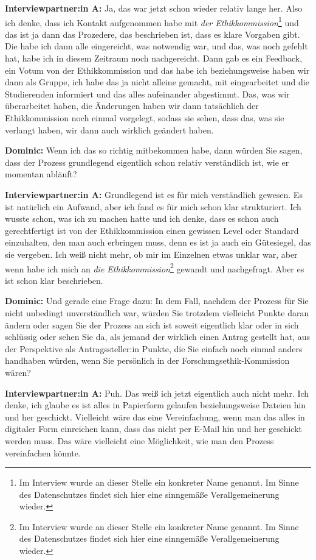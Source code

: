 \documentclass[a4paper,12pt,twoside]{scrreprt}
\begin{document}
\textbf{Interviewpartner:in A:} Ja, das war jetzt schon wieder relativ lange her. Also ich denke, dass ich Kontakt aufgenommen habe mit \textit{der Ethikkommission}\footnote{Im Interview wurde an dieser Stelle ein konkreter Name genannt. Im Sinne des Datenschutzes findet sich hier eine sinngemäße Verallgemeinerung wieder.} und das ist ja dann das Prozedere, das beschrieben ist, dass es klare Vorgaben gibt. Die habe ich dann alle eingereicht, was notwendig war, und das, was noch gefehlt hat, habe ich in diesem Zeitraum noch nachgereicht. Dann gab es ein Feedback, ein Votum von der Ethikkommission und das habe ich beziehungsweise haben wir dann als Gruppe, ich habe das ja nicht alleine gemacht, mit eingearbeitet und die Studierenden informiert und das alles aufeinander abgestimmt. Das, was wir überarbeitet haben, die Änderungen haben wir dann tatsächlich der Ethikkommission noch einmal vorgelegt, sodass sie sehen, dass das, was sie verlangt haben, wir dann auch wirklich geändert haben.

\textbf{Dominic:} Wenn ich das so richtig mitbekommen habe, dann würden Sie sagen, dass der Prozess grundlegend eigentlich schon relativ verständlich ist, wie er momentan abläuft?

\textbf{Interviewpartner:in A:} Grundlegend ist es für mich verständlich gewesen. Es ist natürlich ein Aufwand, aber ich fand es für mich schon klar strukturiert. Ich wusste schon, was ich zu machen hatte und ich denke, dass es schon auch gerechtfertigt ist von der Ethikkommission einen gewissen Level oder Standard einzuhalten, den man auch erbringen muss, denn es ist ja auch ein Gütesiegel, das sie vergeben. Ich weiß nicht mehr, ob mir im Einzelnen etwas unklar war, aber wenn habe ich mich an \textit{die Ethikkommission}\footnote{Im Interview wurde an dieser Stelle ein konkreter Name genannt. Im Sinne des Datenschutzes findet sich hier eine sinngemäße Verallgemeinerung wieder.} gewandt und nachgefragt. Aber es ist schon klar beschrieben.

\textbf{Dominic:} Und gerade eine Frage dazu: In dem Fall, nachdem der Prozess für Sie nicht unbedingt unverständlich war, würden Sie trotzdem vielleicht Punkte daran ändern oder sagen Sie der Prozess an sich ist soweit eigentlich klar oder in sich schlüssig oder sehen Sie da, als jemand der wirklich einen Antrag gestellt hat, aus der Perspektive als Antragssteller:in Punkte, die Sie einfach noch einmal anders handhaben würden, wenn Sie persönlich in der Forschungsethik-Kommission wären?

\textbf{Interviewpartner:in A:} Puh. Das weiß ich jetzt eigentlich auch nicht mehr. Ich denke, ich glaube es ist alles in Papierform gelaufen beziehungsweise Dateien hin und her geschickt. Vielleicht wäre das eine Vereinfachung, wenn man das alles in digitaler Form einreichen kann, dass das nicht per E-Mail hin und her geschickt werden muss. Das wäre vielleicht eine Möglichkeit, wie man den Prozess vereinfachen könnte.
\end{document}
